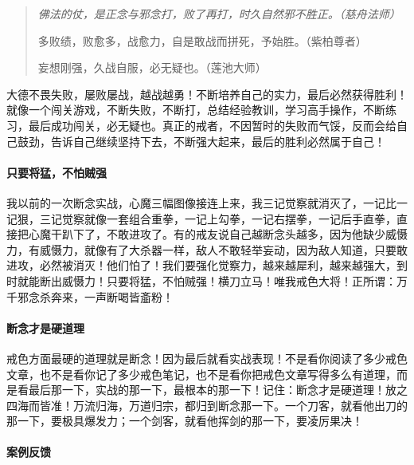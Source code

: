 \begin{quotation}\it
    佛法的仗，是正念与邪念打，败了再打，时久自然邪不胜正。（慈舟法师）

    多败绩，败愈多，战愈力，自是敢战而拼死，予始胜。（紫柏尊者）

    妄想刚强，久战自服，必无疑也。（莲池大师）
\end{quotation}

大德不畏失败，屡败屡战，越战越勇！不断培养自己的实力，最后必然获得胜利！就像一个闯关游戏，不断失败，不断打，总结经验教训，学习高手操作，不断练习，最后成功闯关，必无疑也。真正的戒者，不因暂时的失败而气馁，反而会给自己鼓劲，告诉自己继续坚持下去，不断强大起来，最后的胜利必然属于自己！

\paragraph{只要将猛，不怕贼强}

我以前的一次断念实战，心魔三幅图像接连上来，我三记觉察就消灭了，一记比一记狠，三记觉察就像一套组合重拳，一记上勾拳，一记右摆拳，一记后手直拳，直接把心魔干趴下了，不敢进攻了。有的戒友说自己越断念头越多，因为他缺少威慑力，有威慑力，就像有了大杀器一样，敌人不敢轻举妄动，因为敌人知道，只要敢进攻，必然被消灭！他们怕了！我们要强化觉察力，越来越犀利，越来越强大，到时就能断出威慑力！只要将猛，不怕贼强！横刀立马！唯我戒色大将！正所谓：万千邪念杀奔来，一声断喝皆齑粉！

\paragraph{断念才是硬道理}

戒色方面最硬的道理就是断念！因为最后就看实战表现！不是看你阅读了多少戒色文章，也不是看你记了多少戒色笔记，也不是看你把戒色文章写得多么有道理，而是看最后那一下，实战的那一下，最根本的那一下！记住：断念才是硬道理！放之四海而皆准！万流归海，万道归宗，都归到断念那一下。一个刀客，就看他出刀的那一下，要极具爆发力；一个剑客，就看他挥剑的那一下，要凌厉果决！

\paragraph{案例反馈}

